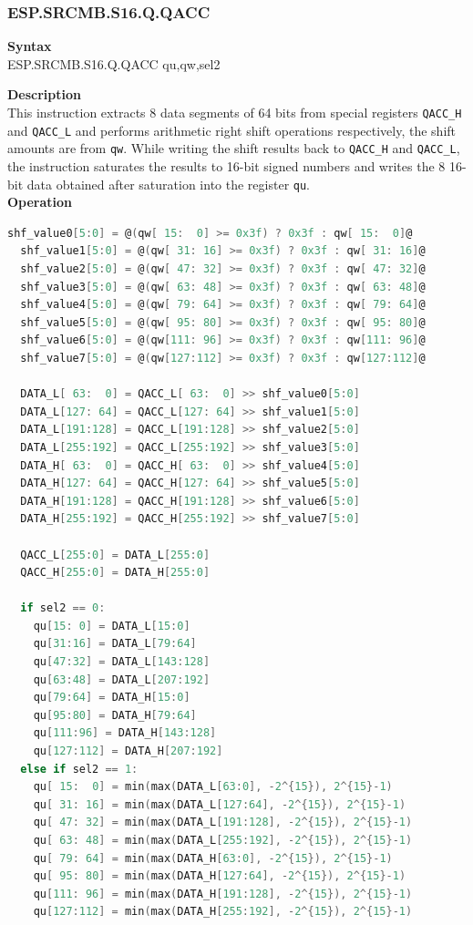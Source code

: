 \newpage
\subsubsection{ESP.SRCMB.S16.Q.QACC}\label{instruction:ESPSRCMBS16QQACC}
\textbf{Syntax}\\
ESP.SRCMB.S16.Q.QACC qu,qw,sel2

\textbf{Description}\\
This instruction extracts 8 data segments of 64 bits from special registers \lstinline{QACC_H} and \lstinline{QACC_L} and performs arithmetic right shift operations respectively, the shift amounts are from \lstinline{qw}. While writing the shift results back to \lstinline{QACC_H} and \lstinline{QACC_L}, the instruction saturates the results to 16-bit signed numbers and writes the 8 16-bit data obtained after saturation into the register \lstinline{qu}.\\
\textbf{Operation}
\begin{lstlisting}[language=C, escapechar=@]
  shf_value0[5:0] = @(qw[ 15:  0] >= 0x3f) ? 0x3f : qw[ 15:  0]@
  shf_value1[5:0] = @(qw[ 31: 16] >= 0x3f) ? 0x3f : qw[ 31: 16]@
  shf_value2[5:0] = @(qw[ 47: 32] >= 0x3f) ? 0x3f : qw[ 47: 32]@
  shf_value3[5:0] = @(qw[ 63: 48] >= 0x3f) ? 0x3f : qw[ 63: 48]@
  shf_value4[5:0] = @(qw[ 79: 64] >= 0x3f) ? 0x3f : qw[ 79: 64]@
  shf_value5[5:0] = @(qw[ 95: 80] >= 0x3f) ? 0x3f : qw[ 95: 80]@
  shf_value6[5:0] = @(qw[111: 96] >= 0x3f) ? 0x3f : qw[111: 96]@
  shf_value7[5:0] = @(qw[127:112] >= 0x3f) ? 0x3f : qw[127:112]@

  DATA_L[ 63:  0] = QACC_L[ 63:  0] >> shf_value0[5:0]
  DATA_L[127: 64] = QACC_L[127: 64] >> shf_value1[5:0]
  DATA_L[191:128] = QACC_L[191:128] >> shf_value2[5:0]
  DATA_L[255:192] = QACC_L[255:192] >> shf_value3[5:0]
  DATA_H[ 63:  0] = QACC_H[ 63:  0] >> shf_value4[5:0]
  DATA_H[127: 64] = QACC_H[127: 64] >> shf_value5[5:0]
  DATA_H[191:128] = QACC_H[191:128] >> shf_value6[5:0]
  DATA_H[255:192] = QACC_H[255:192] >> shf_value7[5:0]

  QACC_L[255:0] = DATA_L[255:0]
  QACC_H[255:0] = DATA_H[255:0]

  if sel2 == 0:
    qu[15: 0] = DATA_L[15:0]
    qu[31:16] = DATA_L[79:64]
    qu[47:32] = DATA_L[143:128]
    qu[63:48] = DATA_L[207:192]
    qu[79:64] = DATA_H[15:0]
    qu[95:80] = DATA_H[79:64]
    qu[111:96] = DATA_H[143:128]
    qu[127:112] = DATA_H[207:192]
  else if sel2 == 1:
    qu[ 15:  0] = min(max(DATA_L[63:0], -2^{15}), 2^{15}-1)
    qu[ 31: 16] = min(max(DATA_L[127:64], -2^{15}), 2^{15}-1)
    qu[ 47: 32] = min(max(DATA_L[191:128], -2^{15}), 2^{15}-1)
    qu[ 63: 48] = min(max(DATA_L[255:192], -2^{15}), 2^{15}-1)
    qu[ 79: 64] = min(max(DATA_H[63:0], -2^{15}), 2^{15}-1)
    qu[ 95: 80] = min(max(DATA_H[127:64], -2^{15}), 2^{15}-1)
    qu[111: 96] = min(max(DATA_H[191:128], -2^{15}), 2^{15}-1)
    qu[127:112] = min(max(DATA_H[255:192], -2^{15}), 2^{15}-1)
\end{lstlisting}

